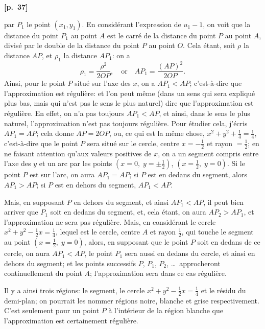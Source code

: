\documentclass[11pt,a4paper]{book}
\begin{document}
\vspace{0.5em}
\noindent\textbf{[p.\ 37]}

par $P_1$ le point $(x_1, y_1)$. En consid\'erant l'expression de $u_1 - 1$, on voit que la distance du point $P_1$ au point $A$ est le carr\'e de la distance du point $P$ au point $A$, divis\'e par le double de la distance du point $P$ au point $O$. Cela \'etant, soit $\rho$ la distance $AP$, et $\rho_1$ la distance $AP_1$: on a
$$
\rho_1 = \frac{\rho^2}{2OP}, \quad \text{or} \quad AP_1 = \frac{(AP)^2}{2OP}.
$$
Ainsi, pour le point $P$ situ\'e sur l'axe des $x$, on a $AP_1 < AP$; c'est-\`a-dire que l'approximation est r\'eguli\`ere: et l'on peut m\^eme (dans un sens qui sera expliqu\'e plus bas, mais qui n'est pas le sens le plus naturel) dire que l'approximation est r\'eguli\`ere. En effet, on n'a pas toujours $AP_1 < AP$, et ainsi, dans le sens le plus naturel, l'approximation n'est pas toujours r\'eguli\`ere. Pour \'etudier cela, j'\'ecris $AP_1 = AP$; cela donne $AP = 2OP$, ou, ce qui est la m\^eme chose, $x^2 + y^2 + \frac{1}{4} = \frac{1}{4}$, c'est-\`a-dire que le point $P$ sera situ\'e sur le cercle, centre $x = -\frac{1}{2}$ et rayon $= \frac{1}{2}$; en ne faisant attention qu'aux valeurs positives de $x$, on a un segment compris entre l'axe des $y$ et un arc par les points $(x = 0,\; y = \pm \frac{1}{2})$, $(x = \frac{1}{2},\; y = 0)$. Si le point $P$ est sur l'arc, on aura $AP_1 = AP$; si $P$ est en dedans du segment, alors $AP_1 > AP$; si $P$ est en dehors du segment, $AP_1 < AP$.

Mais, en supposant $P$ en dehors du segment, et ainsi $AP_1 < AP$, il peut bien arriver que $P_1$ soit en dedans du segment, et, cela \'etant, on aura $AP_2 > AP_1$, et l'approximation ne sera pas r\'eguli\`ere. Mais, en consid\'erant le cercle $x^2 + y^2 - \frac{1}{2}x = \frac{1}{4}$, lequel est le cercle, centre $A$ et rayon $\frac{1}{2}$, qui touche le segment au point $(x = \frac{1}{2},\; y = 0)$, alors, en supposant que le point $P$ soit en dedans de ce cercle, on aura $AP_1 < AP$, le point $P_1$ sera aussi en dedans du cercle, et ainsi en dehors du segment; et les points successifs $P$, $P_1$, $P_2$, \ldots\ approcheront continuellement du point $A$; l'approximation sera dans ce cas r\'eguli\`ere.

Il y a ainsi trois r\'egions: le segment, le cercle $x^2 + y^2 - \frac{1}{2}x = \frac{1}{4}$ et le r\'esidu du demi-plan; on pourrait les nommer r\'egions noire, blanche et grise respectivement. C'est seulement pour un point $P$ \`a l'int\'erieur de la r\'egion blanche que l'approximation est certainement r\'eguli\`ere.
\end{document}
